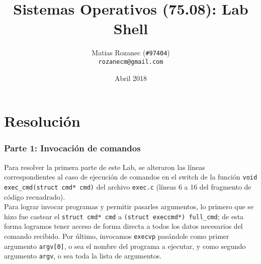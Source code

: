 \documentclass{article}
\title{Sistemas Operativos (75.08): Lab Shell}
\author{Matias Rozanec (\texttt{\#97404})\\\texttt{rozanecm@gmail.com}}
\date{Abril 2018}
\begin{document}
\maketitle
\newpage

\tableofcontents
\newpage

% 

\part{Resolución}
\section{Parte 1: Invocación de comandos}
Para resolver la primera parte de este Lab, se alteraron las líneas correspondientes al caso de ejecución de comandos en el switch de la función \texttt{void exec\_cmd(struct cmd* cmd)} del archivo \texttt{exec.c} (líneas 6 a 16 del fragmento de código recuadrado).\\

Para lograr invocar programas y permitir pasarles argumentos, lo primero que se hizo fue castear el \texttt{struct cmd* cmd} a \texttt{(struct execcmd*) full\_cmd}; de esta forma logramos tener acceso de forma directa a todos los datos necesarios del comando recibido. Por último, invocamos \texttt{execvp} pasándole como primer argumento \texttt{argv[0]}, o sea el nombre del programa a ejecutar, y como segundo argumento \texttt{argv}, o sea toda la lista de argumentos.\\
\end{document}
